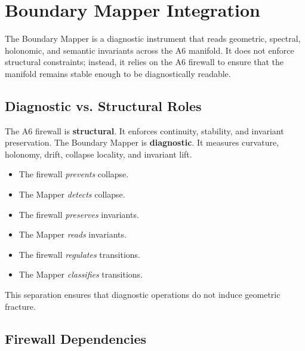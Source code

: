 
\section{Boundary Mapper Integration}

The Boundary Mapper is a diagnostic instrument that reads geometric,
spectral, holonomic, and semantic invariants across the A6 manifold. It does
not enforce structural constraints; instead, it relies on the A6 firewall to
ensure that the manifold remains stable enough to be diagnostically readable.

\subsection{Diagnostic vs. Structural Roles}

The A6 firewall is \textbf{structural}. It enforces continuity, stability,
and invariant preservation. The Boundary Mapper is \textbf{diagnostic}. It
measures curvature, holonomy, drift, collapse locality, and invariant lift.

\begin{itemize}
    \item The firewall \emph{prevents} collapse.
    \item The Mapper \emph{detects} collapse.
    \item The firewall \emph{preserves} invariants.
    \item The Mapper \emph{reads} invariants.
    \item The firewall \emph{regulates} transitions.
    \item The Mapper \emph{classifies} transitions.
\end{itemize}

This separation ensures that diagnostic operations do not induce geometric
fracture.

\subsection{Firewall Dependencies}


